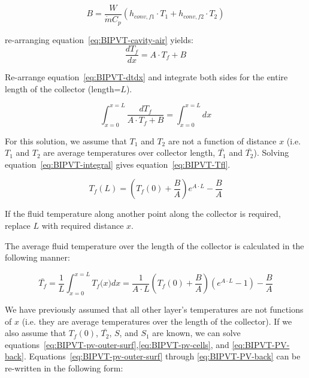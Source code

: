 \begin{equation}
B=\frac{W}{\dot{m}C_p}\left(h_{conv,f1}\cdot T_1+h_{conv,f2}\cdot T_2\right)		
\label{eq:BIPVT-B}
\end{equation}

re-arranging equation~\ref{eq:BIPVT-cavity-air} yields:
\begin{equation}
\frac{dT_f}{dx}=A\cdot T_f+B 	
\label{eq:BIPVT-dtdx}
\end{equation}

Re-arrange equation~\ref{eq:BIPVT-dtdx} and integrate both sides for the entire length of the collector (length=\(L\)).

\begin{equation}
\int_{x=0}^{x=L}{\frac{dT_f}{{A\cdot T}_f+B}=\int_{x=0}^{x=L}dx}	
\label{eq:BIPVT-integral}
\end{equation}

For this solution, we assume that \(T_{1}\) and \(T_{2}\) are not a function of distance \(x\) (i.e. \(T_{1}\) and \(T_{2}\) are average temperatures over collector length, \(\bar{T_{1}}\) and \(\bar{T_{2}}\)). Solving equation~\ref{eq:BIPVT-integral} gives equation~\ref{eq:BIPVT-Tfl}.

\begin{equation}
T_f(L)=\left(T_f(0)+\frac{B}{A}\right)e^{A\cdot L}-\frac{B}{A}
\label{eq:BIPVT-Tfl}
\end{equation}

If the fluid temperature along another point along the collector is required, replace \(L\) with required distance \(x\).

The average fluid temperature over the length of the collector is calculated in the following manner:

\begin{equation}
\bar{T_f}=\frac{1}{L}\int_{x=0}^{x=L}{T_f(x})dx=\frac{1}{A\cdot L}\left(T_f\left(0\right)+\frac{B}{A}\right)\left(e^{A\cdot L}-1\right)-\frac{B}{A}
\label{eq:BIPVT-tfl-avg}
\end{equation}

We have previously assumed that all other layer's temperatures are not functions of \(x\) (i.e. they are average temperatures over the length of the collector). If we also assume that \(T_{f}(0)\), \(\bar{T_{2}}\), \(S\), and \(S_{1}\) are known, we can solve equations~\ref{eq:BIPVT-pv-outer-surf},\ref{eq:BIPVT-pv-cells}, and \ref{eq:BIPVT-PV-back}. Equations~\ref{eq:BIPVT-pv-outer-surf} through \ref{eq:BIPVT-PV-back} can be re-written in the following form:

